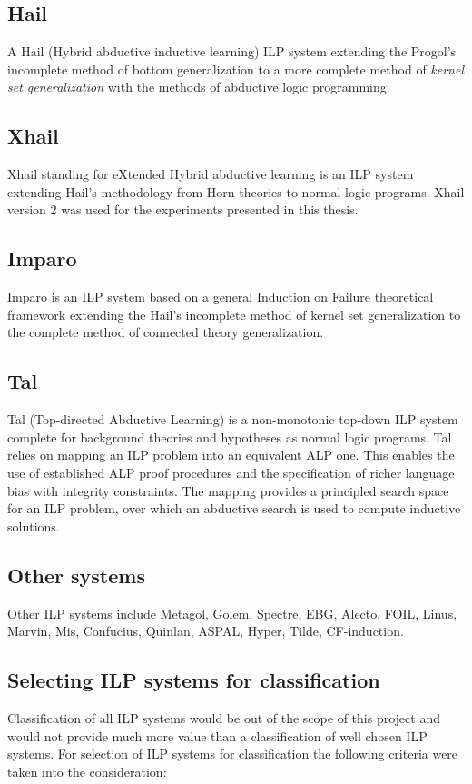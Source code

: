 \subsection{Hail\cite{ray2003hybrid}\cite{ray2005phdHybrid}}
A Hail (Hybrid abductive inductive learning) ILP system extending the Progol's incomplete method of bottom generalization to a more complete method of \emph{kernel set generalization} with the methods of abductive logic programming.

\subsection{Xhail\cite{ray2009nonmonotonic}}
Xhail standing for eXtended Hybrid abductive learning is an ILP system extending Hail's methodology from Horn theories to normal logic programs.
Xhail version 2 was used for the experiments presented in this thesis.

\subsection{Imparo}\cite{kimber2012learning}
Imparo is an ILP system based on a general Induction on Failure theoretical framework extending the Hail's incomplete method of kernel set generalization to the complete method of connected theory generalization.

\subsection{Tal\cite{corapi2010inductive}\cite{corapi2011tal}}
Tal (Top-directed Abductive Learning) is a non-monotonic top-down ILP system complete for background theories and hypotheses as normal logic programs. 
Tal relies on mapping an ILP problem into an equivalent ALP one. This enables the
use of established ALP proof procedures and the specification of richer language bias with integrity constraints. The mapping provides a principled search space for an ILP problem, over which an abductive search is used to compute inductive solutions.

\subsection{Other systems}
Other ILP systems include Metagol, Golem, Spectre, EBG, Alecto, FOIL, Linus, Marvin, Mis, Confucius, Quinlan, ASPAL, Hyper,  Tilde, CF-induction.

\subsection{Selecting ILP systems for classification}
Classification of all ILP systems would be out of the scope of this project and would not provide much more value than a classification of well chosen ILP systems.
For selection of ILP systems for classification the following criteria were taken into the consideration:

